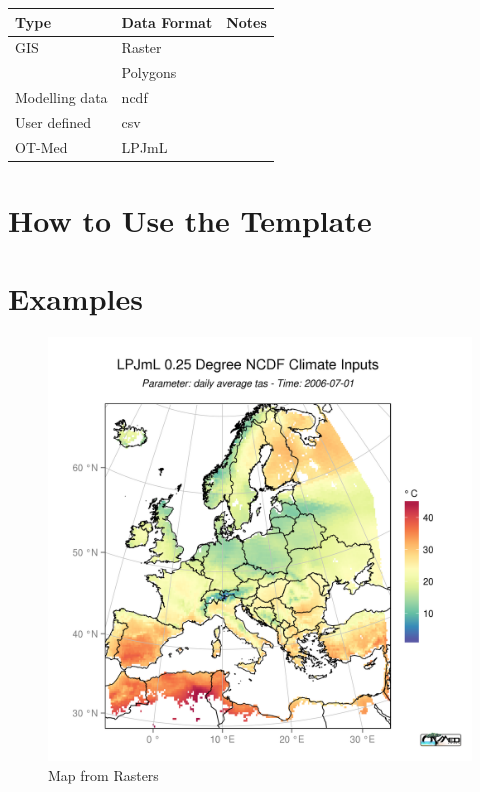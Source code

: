 \documentclass[a4paper,10pt]{article}
\begin{document}
\begin{tabular}{l l l}
 
Type& Data Format    & Notes\\
\hline
GIS&Raster & \\
&Polygons&\\
Modelling data & ncdf &\\
User defined& csv & \\

OT-Med &LPJmL&\\
	
\end{tabular}









\section{How to Use the Template}
\section{Examples}
\begin{figure}
  \centering
    \includegraphics[width=1\textwidth]{std}
  \caption{Map from Rasters}
  \label{fig:std}
\end{figure}
\end{document}

